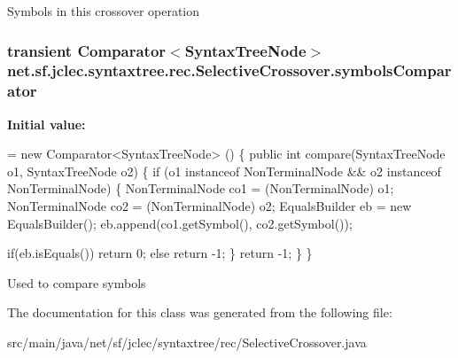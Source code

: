 Symbols in this crossover operation \hypertarget{classnet_1_1sf_1_1jclec_1_1syntaxtree_1_1rec_1_1_selective_crossover_a768760cd34e2b15e76190d740a7646b5}{
\subsubsection[{symbols\-Comparator}]{\setlength{\rightskip}{0pt plus 5cm}transient Comparator$<${\bf Syntax\-Tree\-Node}$>$ net.\-sf.\-jclec.\-syntaxtree.\-rec.\-Selective\-Crossover.\-symbols\-Comparator\hspace{0.3cm}{\ttfamily [protected]}}}\label{classnet_1_1sf_1_1jclec_1_1syntaxtree_1_1rec_1_1_selective_crossover_a768760cd34e2b15e76190d740a7646b5}
{\bfseries Initial value\-:}
\begin{DoxyCode}
= \textcolor{keyword}{new} Comparator<SyntaxTreeNode> ()
    \{
        \textcolor{keyword}{public} \textcolor{keywordtype}{int} compare(SyntaxTreeNode o1, SyntaxTreeNode o2) 
        \{           
            \textcolor{keywordflow}{if} (o1 instanceof NonTerminalNode && o2 instanceof NonTerminalNode) \{
                NonTerminalNode co1 = (NonTerminalNode) o1;
                NonTerminalNode co2 = (NonTerminalNode) o2;
                EqualsBuilder eb = \textcolor{keyword}{new} EqualsBuilder();
                eb.append(co1.getSymbol(), co2.getSymbol());
                
                \textcolor{keywordflow}{if}(eb.isEquals())
                    \textcolor{keywordflow}{return} 0;
                \textcolor{keywordflow}{else}
                    \textcolor{keywordflow}{return} -1;
            \}
            \textcolor{keywordflow}{return} -1;
        \}   
    \}
\end{DoxyCode}
Used to compare symbols 

The documentation for this class was generated from the following file\-:\begin{DoxyCompactItemize}
\item 
src/main/java/net/sf/jclec/syntaxtree/rec/Selective\-Crossover.\-java\end{DoxyCompactItemize}
